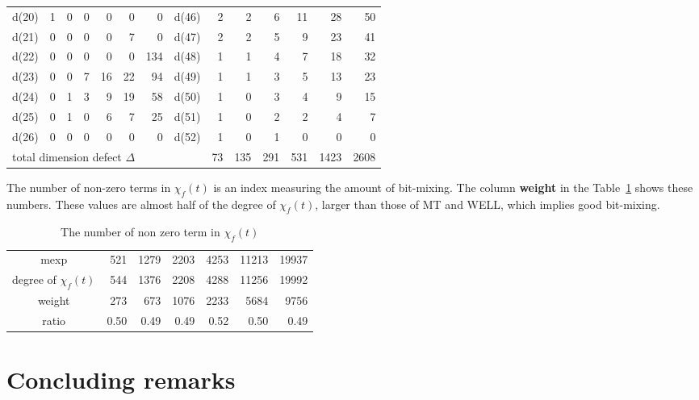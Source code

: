\documentclass{svmult}
\begin{document}
\begin{table}
\begin{center}
\begin{tabular}{|r|rrrrrr||r|rrrrrr|}
      d(20) & 1 & 0 & 0 & 0 & 0 & 0 & d(46) & 2 & 2 & 6 & 11 & 28 & 50 \\
      d(21) & 0 & 0 & 0 & 0 & 7 & 0 & d(47) & 2 & 2 & 5 & 9 & 23 & 41 \\
      d(22) & 0 & 0 & 0 & 0 & 0 & 134 & d(48) & 1 & 1 & 4 & 7 & 18 & 32 \\
      d(23) & 0 & 0 & 7 & 16 & 22 & 94 & d(49) & 1 & 1 & 3 & 5 & 13 & 23 \\
      d(24) & 0 & 1 & 3 & 9 & 19 & 58 & d(50) & 1 & 0 & 3 & 4 & 9 & 15 \\
      d(25) & 0 & 1 & 0 & 6 & 7 & 25 & d(51) & 1 & 0 & 2 & 2 & 4 & 7 \\
      d(26) & 0 & 0 & 0 & 0 & 0 & 0 & d(52) & 1 & 0 & 1 & 0 & 0 & 0 \\ \hline
      \multicolumn{8}{|l|}{total dimension defect $\Delta$} 
      & 73 & 135 & 291 & 531 & 1423 & 2608 \\ \hline
    \end{tabular}
  \end{center}
\end{table}

\begin{remark}
  The number of non-zero terms in $\chi_f(t)$ is an index measuring
  the amount of bit-mixing.  The column \textbf{weight} in the 
  Table~\ref{tab:weight} shows these numbers. These values are almost
  half of the degree of $\chi_f(t)$, larger than those of MT
  and WELL, which implies good bit-mixing.
\end{remark}

\begin{table}[h]
  \begin{center}
    \caption{The number of non zero term in $\chi_f(t)$}
    \label{tab:weight}
    \begin{tabular}{c|rrrrrr} \hline
      mexp & 521 & 1279 & 2203 & 4253 & 11213 & 19937 \\
      degree of $\chi_f(t)$ & 544 & 1376 & 2208 & 4288 & 11256 & 19992 \\
      weight & 273 & 673 & 1076 & 2233 & 5684 & 9756 \\ 
      ratio & 0.50 & 0.49 & 0.49 & 0.52 & 0.50 & 0.49 \\ \hline
    \end{tabular}
  \end{center}
\end{table}
\section{Concluding remarks}
\end{document}
